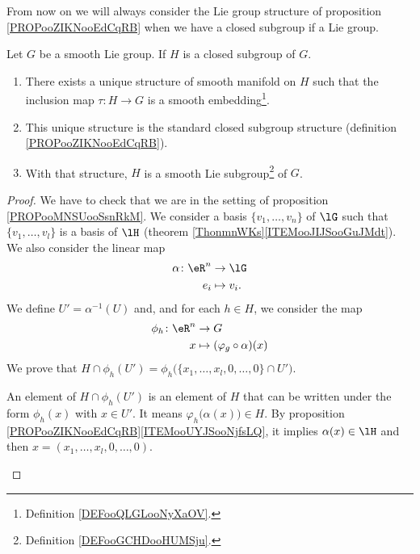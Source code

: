 \begin{normaltext}
	From now on we will always consider the Lie group structure of proposition \ref{PROPooZIKNooEdCqRB} when we have a closed subgroup if a Lie group.
\end{normaltext}


\begin{theorem}     \label{THOooDEJHooVKJYBL}
Let \( G\) be a smooth Lie group. If \( H\) is a closed subgroup of \( G\).
\begin{enumerate}
	\item
	      There exists a unique structure of smooth manifold on \( H\) such that the inclusion map \( \tau\colon H\to G\) is a smooth embedding\footnote{Definition \ref{DEFooQLGLooNyXaOV}.}.
	\item		\label{ITEMooZYPUooLxuCbj}
	      This unique structure is the standard closed subgroup structure (definition \ref{PROPooZIKNooEdCqRB}).
	\item	\label{ITEMooZCFHooJJTLeg}
	      With that structure, \( H\) is a smooth Lie subgroup\footnote{Definition \ref{DEFooGCHDooHUMSju}.} of \( G\).
\end{enumerate}

\begin{proof}
	We have to check that we are in the setting of proposition \ref{PROPooMNSUooSsnRkM}. We consider a basis \( \{ v_1,\ldots,v_n \}\) of \( \lG\) such that \( \{ v_1,\ldots,v_l \}\) is a basis of \( \lH\) (theorem \ref{ThonmnWKs}\ref{ITEMooJIJSooGuJMdt}). We also consider the linear map
	\begin{equation}
		\begin{aligned}
			\alpha\colon \eR^n & \to \lG      \\
			e_i                & \mapsto v_i.
		\end{aligned}
	\end{equation}
	We define \( U'=\alpha^{-1}(U)\) and, and for each \( h\in H\), we consider the map
	\begin{equation}
		\begin{aligned}
			\phi_h\colon \eR^n & \to G                             \\
			x                  & \mapsto (\varphi_g\circ\alpha)(x)
		\end{aligned}
	\end{equation}
	We prove that \( H\cap \phi_h(U')=\phi_h\big( \{ x_1,\ldots,x_l,0,\ldots,0 \}\cap U' \big)\).
	\begin{subproof}
		An element of \( H\cap \phi_h(U')\) is an element of \( H\) that can be written under the form \( \phi_h(x)\) with \( x\in U'\). It means \( \varphi_h\big( \alpha(x) \big)\in H\). By proposition \ref{PROPooZIKNooEdCqRB}\ref{ITEMooUYJSooNjfsLQ}, it implies \( \alpha(x)\in \lH\) and then \( x=(x_1,\ldots,x_l,0,\ldots,0)\).


\end{subproof}
\end{proof}
\end{theorem}
